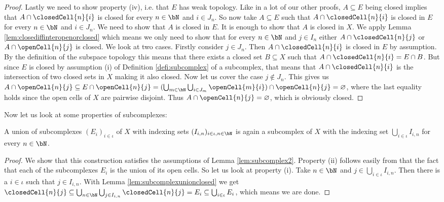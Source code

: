 \begin{proof}
    Lastly we need to show property (iv), i.e. that $E$ has weak topology. 
    Like in a lot of our other proofs, $A \subseteq E$ being closed implies that $A \cap \closedCell{n}{i}$ is closed for every $n \in \bN$ and $i \in J_n$. 
    So now take $A \subseteq E$ such that $A \cap \closedCell{n}{i}$ is closed in $E$ for every $n \in \bN$ and $i \in J_n$. 
    We need to show that $A$ is closed in $E$.
    It is enough to show that $A$ is closed in $X$. 
    We apply Lemma \ref{lem:closediffinteropenorclosed} which means we only need to show that for every $n \in \bN$ and $j \in I_n$ either $A \cap \closedCell{n}{j}$ or $A \cap \openCell{n}{j}$ is closed. 
    We look at two cases. 
    Firstly consider $j \in J_n$. 
    Then $A \cap \closedCell{n}{i}$ is closed in $E$ by assumption.
    By the definition of the subspace topology this means that there exists a closed set $B \subseteq X$ such that $A \cap \closedCell{n}{i} = E \cap B$. 
    But since $E$ is closed by assumption (i) of Definition \ref{defi:subcomplex} of a subcomplex, that means that $A \cap \closedCell{n}{i}$ is the intersection of two closed sets in $X$ making it also closed. 
    Now let us cover the case $j \notin J_n$. 
    This gives us $A \cap \openCell{n}{j} \subseteq E \cap \openCell{n}{j} = (\bigcup_{m \in \bN} \bigcup_{i \in J_m} \openCell{m}{i}) \cap \openCell{n}{j} = \varnothing$, where the last equality holds since the open cells of $X$ are pairwise disjoint. 
    Thus $A \cap \openCell{n}{j} = \varnothing$, which is obviously closed.
\end{proof}

Now let us look at some properties of subcomplexes: 

\begin{lem} \label{lem:unionsubcomplexes}
    A union of subcomplexes $(E_i)_{i \in \iota}$ of $X$  with indexing sets $(I_{i, n})_{i \in \iota, n \in \bN}$ is again a subcomplex of $X$ with the indexing set $\bigcup_{i \in \iota} I_{i, n}$ for every $n \in \bN$.
    \href{https://github.com/scholzhannah/CWComplexes/blob/7be4872a05b534011cc969eb5b80a4b7f0bf57e2/CWcomplexes/subcomplex.lean#L190-L209}{\faExternalLink}
\end{lem}
\begin{proof}
    We show that this construction satisfies the assumptions of Lemma \ref{lem:subcomplex2}. 
    Property (ii) follows easily from that the fact that each of the subcomplexes $E_i$ is the union of its open cells. 
    So let us look at property (i).
    Take $n \in \bN$ and $j \in \bigcup_{i \in \iota} I_{i, n}$. 
    Then there is a $i \in \iota$ such that $j \in I_{i, n}$. 
    With Lemma \ref{lem:subcomplexunionclosed} we get 
    $\closedCell{n}{j} \subseteq \bigcup_{n \in \bN}\bigcup_{j \in I_{i, n}} \closedCell{n}{j} = E_i \subseteq \bigcup_{i \in \iota} E_i$, which means we are done.
\end{proof}

